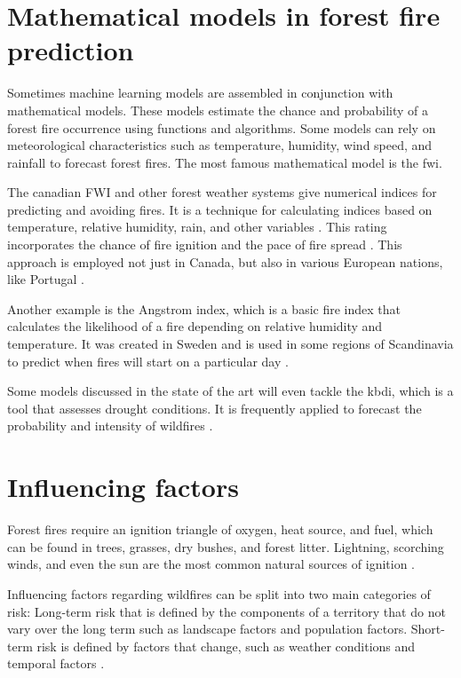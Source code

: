 \section{Mathematical models in forest fire prediction}

Sometimes machine learning models are assembled in conjunction with mathematical models. These models estimate the chance and probability of a forest fire occurrence using functions and algorithms. Some models can rely on meteorological characteristics such as temperature, humidity, wind speed, and rainfall to forecast forest fires. The most famous mathematical model is the \gls{fwi}. 


The canadian FWI and other forest weather systems give numerical indices for predicting and avoiding fires. It is a technique for calculating indices based on temperature, relative humidity, rain, and other variables \cite{mohammed2020comparative}. This rating incorporates the chance of fire ignition and the pace of fire spread \cite{doi:10.1155/2014/597368}. This approach is employed not just in Canada, but also in various European nations, like Portugal \cite{mohammed2020comparative}. 


Another example is the Angstrom index, which is a basic fire index that calculates the likelihood of a fire depending on relative humidity and temperature. It was created in Sweden and is used in some regions of Scandinavia to predict when fires will start on a particular day \cite{land12010194}. 


Some models discussed in the state of the art will even tackle the \gls{kbdi}, which is a tool that assesses drought conditions. It is frequently applied to forecast the probability and intensity of wildfires \cite{KBDI}.

\section{Influencing factors}
\label{influencing_factors}

Forest fires require an ignition triangle of oxygen, heat source, and fuel, which can be found in trees, grasses, dry bushes, and forest litter. Lightning, scorching winds, and even the sun are the most common natural sources of ignition \cite{rs13132513}. 


Influencing factors regarding wildfires can be split into two main categories of risk: Long-term risk that is defined by the components of a territory that do not vary over the long term such as landscape factors and population factors. Short-term risk is defined by factors that change, such as weather conditions and temporal factors \cite{Novo2020MappingFF}.


